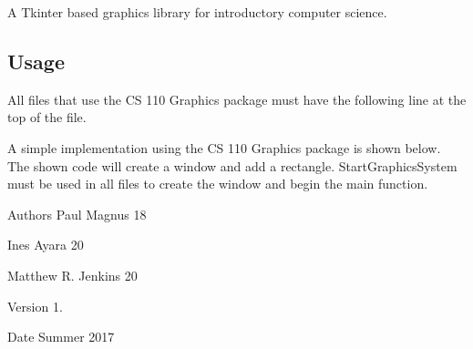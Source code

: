 A Tkinter based graphics library for introductory computer science. \subsection*{Usage}



 All files that use the CS 110 Graphics package must have the following line at the top of the file. 
\begin{DoxyCode}{0}
\end{DoxyCode}
 A simple implementation using the CS 110 Graphics package is shown below. The shown code will create a window and add a rectangle. Start\+Graphics\+System must be used in all files to create the window and begin the main function. 
\begin{DoxyCode}{0}
\DoxyCodeLine{}
\DoxyCodeLine{}
\end{DoxyCode}
 \begin{DoxyAuthor}{Authors}
Paul Magnus \textquotesingle{}18 

Ines Ayara \textquotesingle{}20 

Matthew R. Jenkins \textquotesingle{}20 
\end{DoxyAuthor}
\begin{DoxyVersion}{Version}
1. 
\end{DoxyVersion}
\begin{DoxyDate}{Date}
Summer 2017 
\end{DoxyDate}
